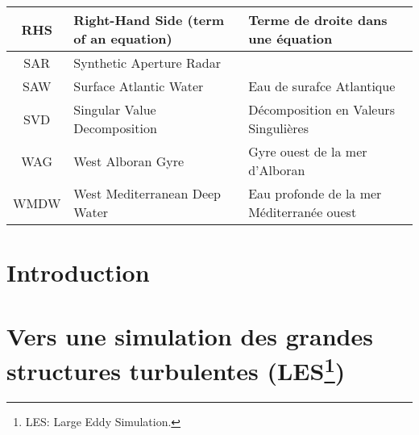\documentclass[a4paper,12pt,notitlepage,twoside]{report}
\numberwithin{equation}{section}
\begin{document}
\begin{table}[!h]
\begin{tabular}{|c|ll|}
                \hline
                RHS & Right-Hand Side (term of an equation) & Terme de droite dans une équation \\
                \hline
                SAR & Synthetic Aperture Radar & \\
                \hline
                SAW & Surface Atlantic Water & Eau de surafce Atlantique\\
                \hline
                SVD & Singular Value Decomposition & Décomposition en Valeurs Singulières  \\
                \hline
                WAG & West Alboran Gyre & Gyre ouest de la mer d'Alboran\\
                \hline
                WMDW & West Mediterranean Deep Water & Eau profonde de la mer Méditerranée ouest\\
                \hline
        \end{tabular}
\end{table}


\newpage
\chapter{Introduction}
\label{chapINTRO}




\chapter[Vers une simulation des grandes structures turbulentes]{Vers une simulation des grandes structures turbulentes (LES\footnote{LES: Large Eddy Simulation.\label{LES}})}
\label{chap2}
\end{document}
